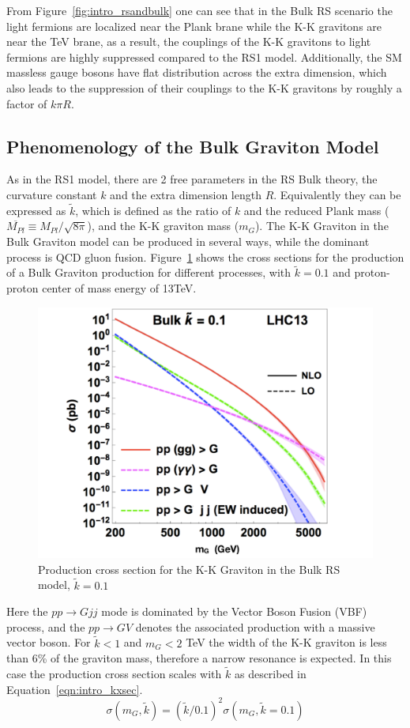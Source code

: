From Figure~\ref{fig:intro_rsandbulk} one can see that in the Bulk RS scenario the light fermions are localized near the Plank brane while the K-K gravitons are near the TeV brane, as a result, the couplings of the K-K gravitons to light fermions are highly suppressed compared to the RS1 model. Additionally, the SM massless gauge bosons have flat distribution across the extra dimension, which also leads to the suppression of their couplings to the K-K gravitons by roughly a factor of $k\pi R$.

\subsection{Phenomenology of the Bulk Graviton Model}
As in the RS1 model, there are 2 free parameters in the RS Bulk theory, the curvature constant $k$ and the extra dimension length $R$. Equivalently they can be expressed as $\tilde{k}$, which is defined as the ratio of $k$ and the reduced Plank mass ($\overline{M_{Pl}}\equiv M_{Pl}/\sqrt{8\pi}$), and the K-K graviton mass ($m_{G}$). The K-K Graviton in the Bulk Graviton model can be produced in several ways, while the dominant process is QCD gluon fusion. Figure~\ref{fig:intro_Gxsec} shows the cross sections for the production of a Bulk Graviton production for different processes, with $\tilde{k}=0.1$ and proton-proton center of mass energy of 13TeV.
\begin{figure}[htbp]
\begin{center}
\includegraphics[width=0.5\linewidth]{figures/intro_Gxsec.pdf}
\caption{Production cross section for the K-K Graviton in the Bulk RS model, $\tilde{k}=0.1$}
\label{fig:intro_Gxsec}
\end{center}
\end{figure}
Here the $pp\rightarrow Gjj$ mode is dominated by the Vector Boson Fusion (VBF) process, and the $pp\rightarrow GV$ denotes the associated production with a massive vector boson. For $\tilde{k}<1$ and $m_{G}<2$ TeV the width of the K-K graviton is less than 6\% of the graviton mass, therefore a narrow resonance is expected. In this case the production cross section scales with $\tilde{k}$ as described in Equation~\ref{eqn:intro_kxsec}.
\begin{equation}
\sigma (m_G,\tilde{k}) = (\tilde{k}/0.1)^2 \sigma (m_G,\tilde{k}=0.1)
\label{eqn:intro_kxsec}
\end{equation}

